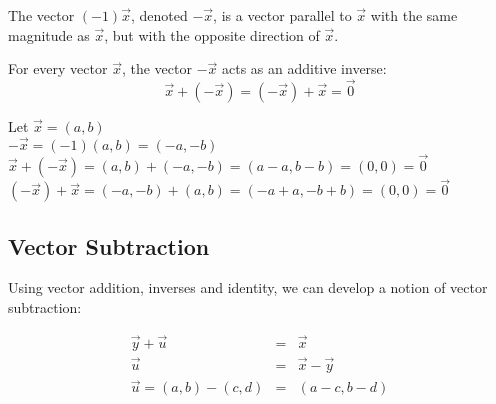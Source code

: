 \documentclass[letterpaper,12pt,fleqn]{article}
\newcommand{\vx}{\vec{x}}
\newcommand{\vy}{\vec{y}}
\newcommand{\vz}{\vec{0}}
\newcommand{\vu}{\vec{u}}
\begin{document}
\begin{notation}
  The vector $(-1)\vx$, denoted $-\vx$, is a vector parallel to $\vx$ with the
  same magnitude as $\vx$, but with the opposite direction of $\vx$.
\end{notation}

\begin{theorem}
  For every vector $\vx$, the vector $-\vx$ acts as an additive inverse:
  \[\vx+(-\vx)=(-\vx)+\vx=\vz\]
\end{theorem}

\begin{theproof}
  Let $\vx=(a,b)$ \\
  $-\vx=(-1)(a,b)=(-a,-b)$ \\
  $\vx+(-\vx)=(a,b)+(-a,-b)=(a-a,b-b)=(0,0)=\vz$ \\
  $(-\vx)+\vx=(-a,-b)+(a,b)=(-a+a,-b+b)=(0,0)=\vz$
\end{theproof}

\newpage

\subsection*{Vector Subtraction}

Using vector addition, inverses and identity, we can develop a notion of vector
subtraction:

\bigskip

\begin{center}
\end{center}

\begin{eqnarray*}
  \vy+\vu &=& \vx \\
  \vu &=& \vx-\vy \\
  \vu=(a,b)-(c,d) &=& (a-c,b-d)
\end{eqnarray*}
\end{document}
